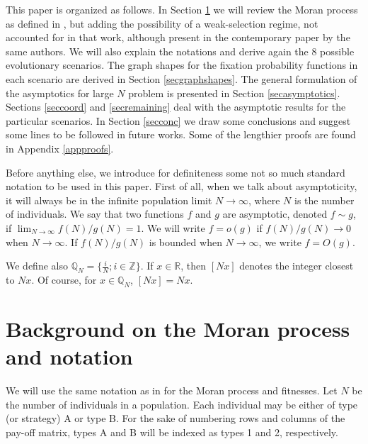 \documentclass[12pt]{article}
\begin{document}
This paper is organized as follows. In Section \ref{secbackground} we will review the Moran process as defined in \cite{taylor}, but adding the possibility of a weak-selection regime, not accounted for in that work, although present in the contemporary paper \cite{nowaknature} by the same authors. We will also explain the notations and derive again the 8 possible evolutionary scenarios. The graph shapes for the fixation probability functions in each scenario are derived in Section \ref{secgraphshapes}. The general formulation of the asymptotics for large $N$ problem is presented in Section \ref{secasymptotics}. Sections \ref{seccoord} and \ref{secremaining} deal with the asymptotic results for the particular scenarios. In Section \ref{secconc} we draw some conclusions and suggest some lines to be followed in future works. Some of the lengthier proofs are found in Appendix \ref{appproofs}.

Before anything else, we introduce for definiteness some not so much standard notation to be used in this paper. First of all, when we talk about asymptoticity, it will always be in the infinite population limit $N \rightarrow \infty$, where $N$ is the number of individuals. We say that two functions $f$ and $g$ are asymptotic, denoted $f \sim g$, if  $\lim_{N \rightarrow \infty}f(N)/g(N)=1$. We will write $f=o(g)$ if $f(N)/g(N) \rightarrow 0$ when $N \rightarrow \infty$. If $f(N)/g(N)$ is bounded when $N \rightarrow \infty$, we write $f=O(g)$. 

We define also $\mathbb{Q}_N= \{\frac{i}{N} ; i \in \mathbb{Z}\}$. If $x \in \mathbb{R}$, then $[N x]$ denotes the integer closest to $Nx$. Of course, for $x \in \mathbb{Q}_N$, $[Nx]=Nx$.

\section{Background on the Moran process and notation}
\label{secbackground}
We will use the same notation as in \cite{nowaknature} for the Moran process and fitnesses. Let $N$ be the number of individuals in a population. Each individual may be either of type (or strategy) A or type B. For the sake of numbering rows and columns of the pay-off matrix, types A and B will be indexed as types 1 and 2, respectively.
\end{document}
